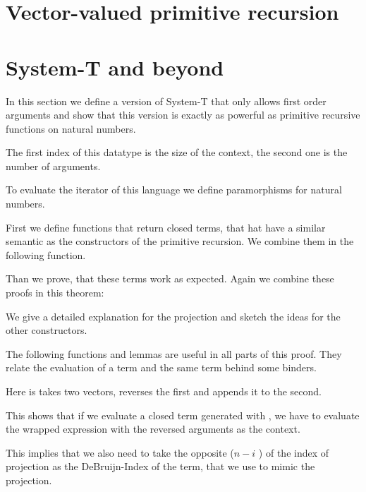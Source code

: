 \documentclass{jfp}
\begin{document}
\section{Vector-valued primitive recursion}
\label{sec:vect-valu-prim}

\section{System-T and beyond}
\label{sec:system-t-beyond}

In this section we define a version of System-T that only allows first order arguments and show that this version is exactly as powerful as primitive recursive functions on natural numbers.

The first index of this datatype is the size of the context, the second one is the number of arguments. 


To evaluate the iterator of this language we define paramorphisms for natural numbers. 


\para
\evalST


First we define functions that return closed terms, that hat have a similar semantic as the constructors of the primitive recursion. We combine them in the following function.


\prToStSig

Than we prove, that these terms work as expected.
Again we combine these proofs in this theorem: 
\embedPRSTSoundSig


We give a detailed explanation for the projection and sketch the ideas for the other constructors.

The following functions and lemmas are useful in all parts of this proof. They relate the evaluation of a term and the same term behind some binders.

\prepLambdas



Here  is takes two vectors, reverses the first and appends it to the second.
\appendR

This shows that if we evaluate a closed term generated with , we have to evaluate the wrapped expression with the reversed arguments as the context.

This implies that we also need to take the opposite ($n - i$ ) of the index of projection as the DeBruijn-Index of the term, that we use to mimic the projection.
\end{document}
